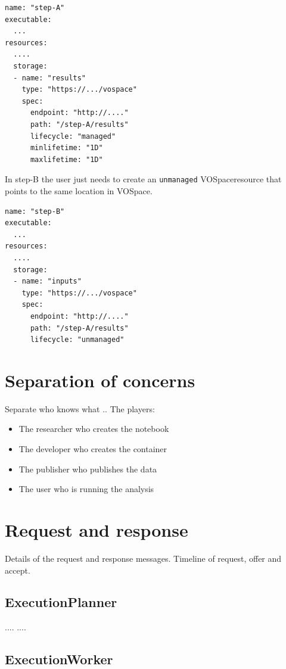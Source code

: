 \documentclass[11pt,a4paper]{ivoa}
\newcommand{\vospace} {VOSpace}
\newcommand{\codeword}[1] {\texttt{#1}}
\begin{document}
\begin{lstlisting}[]
name: "step-A"
executable:
  ...
resources:
  ....
  storage:
  - name: "results"
    type: "https://.../vospace"
    spec:
      endpoint: "http://...."
      path: "/step-A/results"
      lifecycle: "managed"
      minlifetime: "1D"
      maxlifetime: "1D"
\end{lstlisting}

In step-B the user just needs to create an \codeword{unmanaged} \vospace resource
that points to the same location in \vospace.

\begin{lstlisting}[]
name: "step-B"
executable:
  ...
resources:
  ....
  storage:
  - name: "inputs"
    type: "https://.../vospace"
    spec:
      endpoint: "http://...."
      path: "/step-A/results"
      lifecycle: "unmanaged"
\end{lstlisting}

\section{Separation of concerns}
\label{separate-concerns}

Separate who knows what ..
The players:
\begin{itemize}
    \item The researcher who creates the notebook
    \item The developer who creates the container
    \item The publisher who publishes the data
    \item The user who is running the analysis
\end{itemize}


\pagebreak

\section{Request and response}
\label{request-response}

Details of the request and response messages.
Timeline of request, offer and accept.

\subsection{ExecutionPlanner}
\label{execution-planner}

....
....

\subsection{ExecutionWorker}
\label{execution-worker}
\end{document}
